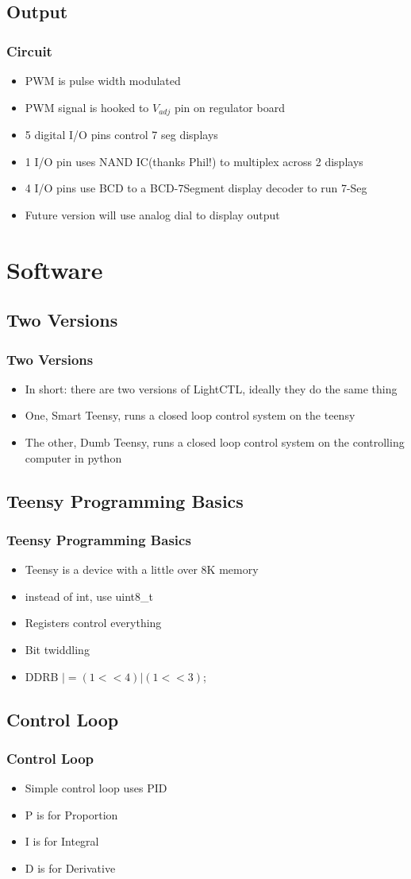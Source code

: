 \documentclass{beamer}
\begin{document}
\subsection{Output}
\frame
{
	\frametitle{Circuit}
	\begin{itemize}
		\item PWM is pulse width modulated
		\item PWM signal is hooked to $V_{adj}$ pin on regulator board
		\item 5 digital I/O pins control 7 seg displays
		\item 1 I/O pin uses NAND IC(thanks Phil!) to multiplex across 2 displays
		\item 4 I/O pins use BCD to a BCD-7Segment display decoder to run 7-Seg
		\item Future version will use analog dial to display output
	\end{itemize}
}
\section{Software}
\subsection{Two Versions}
\frame
{
	\frametitle{Two Versions}
	\begin{itemize}
		\item In short: there are two versions of LightCTL, ideally they do the same thing
		\item One, Smart Teensy, runs a closed loop control system on the teensy
		\item The other, Dumb Teensy, runs a closed loop control system on the controlling computer in python
	\end{itemize}
}
\subsection{Teensy Programming Basics}
\frame
{
	\frametitle{Teensy Programming Basics}
	\begin{itemize}
		\item Teensy is a device with a little over 8K memory
		\item instead of int, use uint8\_t
		\item Registers control everything
		\item Bit twiddling 
		\item DDRB $|= (1<<4)|(1<<3)$;
	\end{itemize}
}
\subsection{Control Loop}
\frame
{
	\frametitle{Control Loop}
	\begin{itemize}
		\item Simple control loop uses PID
		\item P is for Proportion
		\item I is for Integral
		\item D is for Derivative
	\end{itemize}
}
\end{document}
